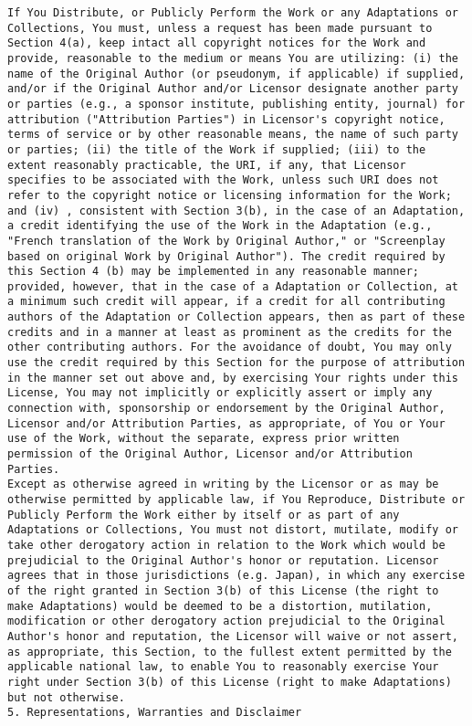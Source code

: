\documentclass[10pt,A4]{book}
\begin{document}
\begin{verbatim}
If You Distribute, or Publicly Perform the Work or any Adaptations or Collections, You must, unless a request has been made pursuant to Section 4(a), keep intact all copyright notices for the Work and provide, reasonable to the medium or means You are utilizing: (i) the name of the Original Author (or pseudonym, if applicable) if supplied, and/or if the Original Author and/or Licensor designate another party or parties (e.g., a sponsor institute, publishing entity, journal) for attribution ("Attribution Parties") in Licensor's copyright notice, terms of service or by other reasonable means, the name of such party or parties; (ii) the title of the Work if supplied; (iii) to the extent reasonably practicable, the URI, if any, that Licensor specifies to be associated with the Work, unless such URI does not refer to the copyright notice or licensing information for the Work; and (iv) , consistent with Section 3(b), in the case of an Adaptation, a credit identifying the use of the Work in the Adaptation (e.g., "French translation of the Work by Original Author," or "Screenplay based on original Work by Original Author"). The credit required by this Section 4 (b) may be implemented in any reasonable manner; provided, however, that in the case of a Adaptation or Collection, at a minimum such credit will appear, if a credit for all contributing authors of the Adaptation or Collection appears, then as part of these credits and in a manner at least as prominent as the credits for the other contributing authors. For the avoidance of doubt, You may only use the credit required by this Section for the purpose of attribution in the manner set out above and, by exercising Your rights under this License, You may not implicitly or explicitly assert or imply any connection with, sponsorship or endorsement by the Original Author, Licensor and/or Attribution Parties, as appropriate, of You or Your use of the Work, without the separate, express prior written permission of the Original Author, Licensor and/or Attribution Parties.
Except as otherwise agreed in writing by the Licensor or as may be otherwise permitted by applicable law, if You Reproduce, Distribute or Publicly Perform the Work either by itself or as part of any Adaptations or Collections, You must not distort, mutilate, modify or take other derogatory action in relation to the Work which would be prejudicial to the Original Author's honor or reputation. Licensor agrees that in those jurisdictions (e.g. Japan), in which any exercise of the right granted in Section 3(b) of this License (the right to make Adaptations) would be deemed to be a distortion, mutilation, modification or other derogatory action prejudicial to the Original Author's honor and reputation, the Licensor will waive or not assert, as appropriate, this Section, to the fullest extent permitted by the applicable national law, to enable You to reasonably exercise Your right under Section 3(b) of this License (right to make Adaptations) but not otherwise.
5. Representations, Warranties and Disclaimer


\end{verbatim}
\end{document}
